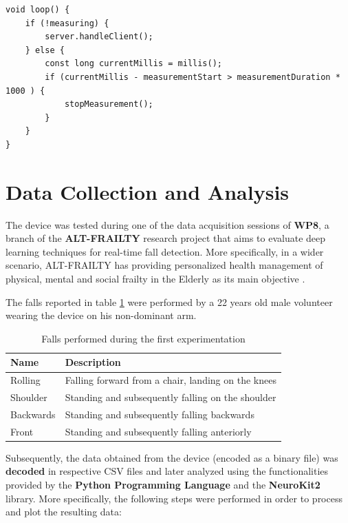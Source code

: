 \begin{verbatim}
void loop() {
    if (!measuring) {
        server.handleClient();
    } else {
        const long currentMillis = millis();
        if (currentMillis - measurementStart > measurementDuration * 1000 ) {
            stopMeasurement();
        }
    }
}
\end{verbatim}

\pagebreak

\section{Data Collection and Analysis}\label{sec:data-collection}


The device was tested during one of the data acquisition sessions of \textbf{WP8}, a branch of the \textbf{ALT-FRAILTY} research project that aims to evaluate deep learning techniques for real-time fall detection. More specifically, in a wider scenario, ALT-FRAILTY has providing personalized health management of physical, mental and social frailty in the Elderly as its main objective \cite{altfrailty}.

The falls reported in table \ref{toc:bitalino-falls} were performed by a 22 years old male volunteer wearing the device on his non-dominant arm.

\vspace{7mm}

\begin{table}[H]
\centering
\begin{tabular}{ll}
    \hline
    Name            &  Description           \\
    \hline
    Rolling         & Falling forward from a chair, landing on the knees \\
    Shoulder        & Standing and subsequently falling on the shoulder \\
    Backwards       & Standing and subsequently falling backwards \\
    Front           & Standing and subsequently falling anteriorly \\
    \hline
\end{tabular}
\caption{Falls performed during the first experimentation}
\label{toc:bitalino-falls}
\end{table}

Subsequently, the data obtained from the device (encoded as a binary file) was \textbf{decoded} in respective CSV files and later analyzed using the functionalities provided by the \textbf{Python Programming Language} and the \textbf{NeuroKit2} \cite{neurokit} library. More specifically, the following steps were performed in order to process and plot the resulting data:

